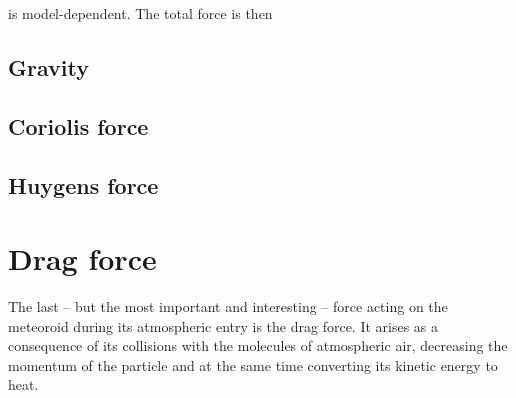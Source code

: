 %



    is model-dependent. The total force is then

    \subsection{Gravity} \label{dfg}
        

    \subsection{Coriolis force} \label{dfC}


    \subsection{Huygens force} \label{dfH}


\section{Drag force} \label{fd}
        The last -- but the most important and interesting -- force acting on the meteoroid during
        its atmospheric entry is the drag force. It arises as a consequence of its collisions with
        the molecules of atmospheric air, decreasing the momentum of the particle and at the
        same time converting its kinetic energy to heat.

